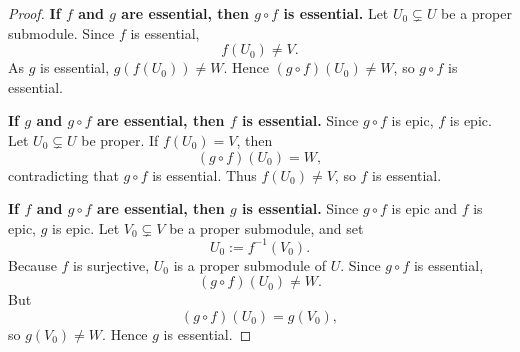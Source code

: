 \begin{proof}
    \textbf{If $f$ and $g$ are essential, then $g\circ f$ is essential.}
    Let $U_0\subsetneq U$ be a proper submodule. Since $f$ is essential,
    \[
        f(U_0)\neq V.
    \]
    As $g$ is essential, $g(f(U_0))\neq W$. Hence $(g\circ f)(U_0)\neq W$, so $g\circ f$ is
    essential.

    \textbf{If $g$ and $g\circ f$ are essential, then $f$ is essential.}
    Since $g\circ f$ is epic, $f$ is epic. Let $U_0\subsetneq U$ be proper. If $f(U_0)=V$, then
    \[
        (g\circ f)(U_0)=W,
    \]
    contradicting that $g\circ f$ is essential. Thus $f(U_0)\neq V$, so $f$ is essential.

    \textbf{If $f$ and $g\circ f$ are essential, then $g$ is essential.}
    Since $g\circ f$ is epic and $f$ is epic, $g$ is epic. Let $V_0\subsetneq V$ be a proper
    submodule, and set
    \[
        U_0:=f^{-1}(V_0).
    \]
    Because $f$ is surjective, $U_0$ is a proper submodule of $U$. Since $g\circ f$ is
    essential,
    \[
        (g\circ f)(U_0)\neq W.
    \]
    But
    \[
        (g\circ f)(U_0)=g(V_0),
    \]
    so $g(V_0)\neq W$. Hence $g$ is essential.
\end{proof}

